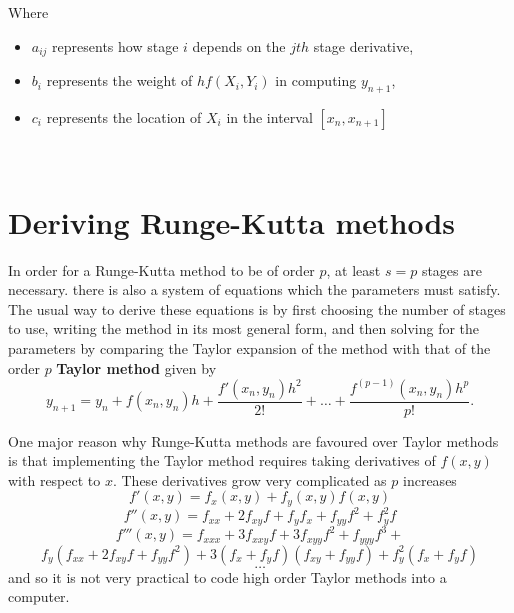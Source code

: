 \documentclass[12pt]{amsart}
\begin{document}
  Where
  \begin{itemize}
    \item $a_{ij}$ represents how stage $i$ depends on the $jth$ stage derivative,
    \item $b_i$ represents the weight of $hf(X_i,Y_i)$ in computing $y_{n+1}$,
    \item $c_i$ represents the location of $X_i$ in the interval $[x_n,x_{n+1}]$
  \end{itemize}
  ~\\

  \section[*]{\textbf{Deriving Runge-Kutta methods}}
  In order for a Runge-Kutta method to be of order $p$, at least $s = p$ stages are necessary.
  there is also a system of equations which the parameters must satisfy.
  The usual way to derive these equations is by first choosing the number of stages to use, 
  writing the method in its most general form, and then solving for the parameters by comparing 
  the Taylor expansion of the method with that of the order $p$ \textbf{Taylor method} given by
  $$y_{n+1} = y_n + f(x_n,y_n)h + \frac{f'(x_n,y_n)h^2}{2!} + \dots + \frac{f^{(p-1)}
      (x_n,y_n)h^p}{p!}.$$

  One major reason why Runge-Kutta methods are favoured over Taylor methods is that 
  implementing the Taylor method requires taking derivatives of $f(x,y)$ with respect to $x$. 
  These derivatives grow very complicated as $p$ increases
  $$f'(x,y) = f_x(x,y) + f_y(x,y)f(x,y)$$
  $$f''(x,y) = f_{xx} + 2f_{xy}f + f_yf_x + f_{yy}f^2 + f_y^2f$$
  $$f'''(x,y) = f_{xxx} + 3f_{xxy}f + 3f_{xyy}f^2 + f_{yyy}f^3 + $$
  $$f_y(f_{xx} + 2f_{xy}f + f_{yy}f^2) +  3(f_x + f_yf)(f_{xy} + f_{yy}f) + f_y^2(f_x +  
      f_yf)$$
  $$\dots$$
  and so it is not very practical to code high order Taylor methods into a computer.
  
\end{document}

